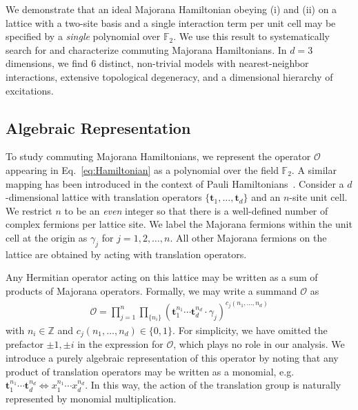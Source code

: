 \documentclass[aps,twocolumn,preprintnumbers,floatfix,showpacs,prx]{revtex4-1}
\begin{document}
We demonstrate that an ideal Majorana Hamiltonian obeying (i) and (ii) on a lattice with a two-site basis and a single interaction term per unit cell
may be specified by a \emph{single} polynomial over $\mathbb{F}_{2}$.
We use this result to systematically search for and characterize commuting Majorana Hamiltonians.
In $d = 3$ dimensions, we find 6 distinct, non-trivial models with
nearest-neighbor interactions,
extensive topological degeneracy, and a dimensional hierarchy of excitations.


\subsection{Algebraic Representation}
To study commuting Majorana Hamiltonians,
we represent the operator $\mathcal{O}$ appearing in Eq.~\eqref{eq:Hamiltonian}
as a polynomial over the field $\mathbb{F}_{2}$.
A similar mapping has been introduced in the context of Pauli Hamiltonians~\cite{Haah_Commuting_Pauli}.
Consider a $d$-dimensional lattice with translation operators
$\{\boldsymbol{t}_{1}, \ldots, \boldsymbol{t}_{d}\}$
and an $n$-site unit cell. We restrict $n$ to be an \emph{even} integer so that there is a well-defined number of complex fermions per lattice site. %
We label the Majorana fermions within the unit cell at the origin as $\gamma_{j}$ for $j = 1, 2, \ldots, n$.
All other Majorana fermions on the lattice are obtained by acting with translation operators.

Any Hermitian operator acting on this lattice may be written as a sum of products of Majorana operators.
Formally, we may write a summand $\mathcal{O}$ as
\begin{align}
\mathcal{O} 
= \prod_{j = 1}^{n}  \prod_{\{n_{i}\}} 
  \left( \boldsymbol{t}_{1}^{n_{1}}\cdots\boldsymbol{t}_{d}^{n_{d}} \cdot \gamma_{j} \right)^{ c_{j} (n_1,\ldots,n_d) }
\label{eq:Operator}
\end{align}
with $n_{i} \in \mathbb{Z}$ and $c_{j}(n_{1},\ldots,n_{d}) \in \{0, 1\}$.
For simplicity, we have omitted the prefactor $\pm 1, \pm i$ in the expression for $\mathcal{O}$,
which plays no role in our analysis.
We introduce a purely algebraic representation of this operator
by noting that any product of translation operators may be written as a monomial,
e.g. $\boldsymbol{t}_1^{n_1}\cdots \boldsymbol{t}_d^{n_d}
\Longleftrightarrow
x_1^{n_1}\cdots x_d^{n_d}$.
In this way, the action of the translation group is naturally represented by monomial multiplication. 
\end{document}
